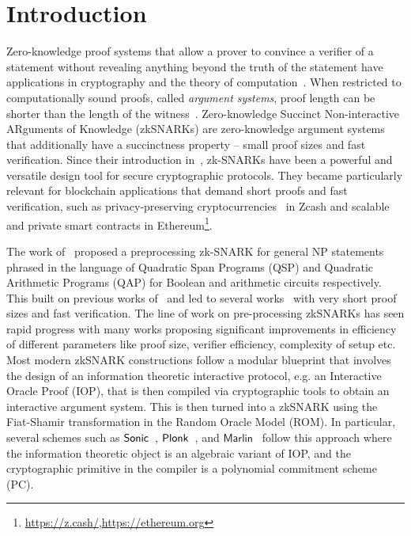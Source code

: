 %
%


\section{Introduction}
Zero-knowledge proof systems that allow a prover to convince a verifier of a statement without revealing anything beyond the truth of the statement have applications in cryptography and the theory of computation~\cite{FOCS:GolMicWig86,STOC:Fortnow87,C:BGGHKMR88}.
When restricted to computationally sound proofs, called \emph{argument systems}, proof length can be shorter than the length of the witness~\cite{brassbard1988minimum}.
Zero-knowledge Succinct Non-interactive ARguments of Knowledge (zkSNARKs) are zero-knowledge argument systems that additionally have a succinctness property -- small proof sizes and fast verification. 
Since their introduction in~\cite{micali1994cs}, zk-SNARKs have been a powerful and versatile design tool for secure cryptographic protocols. They became particularly relevant for blockchain applications that demand short proofs and fast verification, such as privacy-preserving cryptocurrencies~\cite{SP:BCGGMT14} in Zcash and scalable and private smart contracts in Ethereum\footnote{\url{https://z.cash/},\url{https://ethereum.org}}.

The work of~\cite{EC:GGPR13} proposed a preprocessing zk-SNARK for general NP statements phrased in the language of Quadratic Span Programs (QSP) and Quadratic Arithmetic Programs (QAP) for Boolean and arithmetic circuits respectively. This built on previous works of~\cite{IKO07,AC:Groth10a,TCC:Lipmaa12} and led to several works~\cite{TCC:BCIOP13,SP:PHGR13,C:BCGTV13,AC:Lipmaa13,USENIX:BCTV14,EC:Groth16} with very short proof sizes and fast verification. 
The line of work on pre-processing zkSNARKs has seen rapid progress with many works proposing significant improvements in efficiency of different parameters like proof size, verifier efficiency, complexity of setup etc.
Most modern zkSNARK constructions follow a modular blueprint that involves the design of an information theoretic interactive protocol, e.g. an Interactive Oracle Proof (IOP), that is then compiled via cryptographic tools to obtain an interactive argument system.  This is then turned into a zkSNARK using the Fiat-Shamir transformation in the Random Oracle Model (ROM).
In particular, several schemes such as
${\textnormal{\textsf{Sonic}}}$~\cite{CCS:MBKM19}, $\textnormal{\textsf{Plonk}}$~\cite{EPRINT:GabWilCio19}, and $\textsf{Marlin}$~\cite{EC:CHMMVW20}
follow this approach where the information theoretic object is an algebraic variant of IOP, and the cryptographic primitive in the compiler is a polynomial commitment scheme (PC).  


